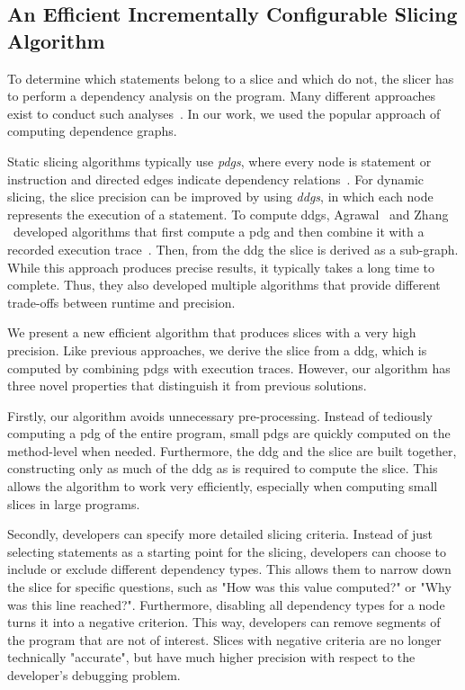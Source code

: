 \subsection{An Efficient Incrementally Configurable Slicing Algorithm}

To determine which statements belong to a slice and which do not, the slicer has to perform a dependency analysis on the program.
Many different approaches exist to conduct such analyses~\cite{korel98:dynamic_program_slicing_methods, tip_94_a_survey_of_program}. 
In our work, we used the popular approach of computing dependence graphs.

Static slicing algorithms typically use \emph{\acp{pdg}}, where every node is statement or instruction and directed edges indicate dependency relations~\cite{weiser81:program_slicing}.
For dynamic slicing, the slice precision can be improved by using \emph{\acp{ddg}}, in which each node represents the execution of a statement.
To compute \acp{ddg}, Agrawal \etal\ and Zhang \etal\ developed algorithms that first compute a \ac{pdg} and then combine it with a recorded execution trace~\cite{agrawal90:dynamic_program_slicing,zhang03:precise_dynamic_slicing_algorithms}.
Then, from the \ac{ddg} the slice is derived as a sub-graph.
While this approach produces precise results, it typically takes a long time to complete.
Thus, they also developed multiple algorithms that provide different trade-offs between runtime and precision.

We present a new efficient algorithm that produces slices with a very high precision.
Like previous approaches, we derive the slice from a \ac{ddg}, which is computed by combining \acp{pdg} with execution traces.
However, our algorithm has three novel properties that distinguish it from previous solutions.

Firstly, our algorithm avoids unnecessary pre-processing.
Instead of tediously computing a \ac{pdg} of the entire program, small \acp{pdg} are quickly computed on the method-level when needed.
Furthermore, the \ac{ddg} and the slice are built together, constructing only as much of the \ac{ddg} as is required to compute the slice.
This allows the algorithm to work very efficiently, especially when computing small slices in large programs.

Secondly, developers can specify more detailed slicing criteria.
Instead of just selecting statements as a starting point for the slicing, developers can choose to include or exclude different dependency types.
This allows them to narrow down the slice for specific questions, such as "How was this value computed?" or "Why was this line reached?".
Furthermore, disabling all dependency types for a node turns it into a negative criterion.
This way, developers can remove segments of the program that are not of interest.
Slices with negative criteria are no longer technically "accurate", but have much higher precision with respect to the developer's debugging problem.

